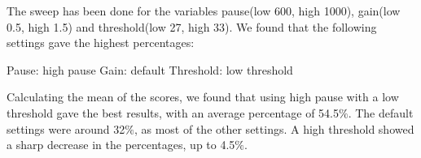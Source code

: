 
The sweep has been done for the variables pause(low 600, high 1000), gain(low 0.5, high 1.5) and threshold(low 27, high 33). We found that the following settings gave the highest percentages:

Pause: high pause
Gain: default
Threshold: low threshold

Calculating the mean of the scores, we found that using high pause with a low threshold gave the best results, with an average percentage of 54.5$\%$. The default settings were around 32$\%$, as most of the other settings. A high threshold showed a sharp decrease in the percentages, up to 4.5$\%$.